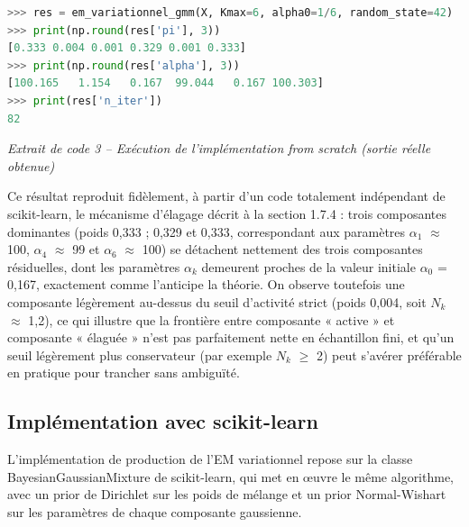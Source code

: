 \begin{lstlisting}[language=Python]
>>> res = em_variationnel_gmm(X, Kmax=6, alpha0=1/6, random_state=42)
>>> print(np.round(res['pi'], 3))
[0.333 0.004 0.001 0.329 0.001 0.333]
>>> print(np.round(res['alpha'], 3))
[100.165   1.154   0.167  99.044   0.167 100.303]
>>> print(res['n_iter'])
82
\end{lstlisting}
\begin{center}\small\emph{Extrait de code 3 -- Exécution de l'implémentation from scratch (sortie réelle obtenue)}\end{center}
Ce résultat reproduit fidèlement, à partir d'un code totalement indépendant de scikit-learn, le mécanisme d'élagage décrit à la section 1.7.4 : trois composantes dominantes (poids 0,333 ; 0,329 et 0,333, correspondant aux paramètres $\alpha _{1}$ $\approx $ 100, $\alpha _{4}$ $\approx $ 99 et $\alpha _{6}$ $\approx $ 100) se détachent nettement des trois composantes résiduelles, dont les paramètres $\alpha _{k}$ demeurent proches de la valeur initiale $\alpha _{0}$ = 0,167, exactement comme l'anticipe la théorie. On observe toutefois une composante légèrement au-dessus du seuil d'activité strict (poids 0,004, soit $N_{k}$ $\approx $ 1,2), ce qui illustre que la frontière entre composante « active » et composante « élaguée » n'est pas parfaitement nette en échantillon fini, et qu'un seuil légèrement plus conservateur (par exemple $N_{k}$ $\geq $ 2) peut s'avérer préférable en pratique pour trancher sans ambiguïté.

\subsection{Implémentation avec scikit-learn}
L'implémentation de production de l'EM variationnel repose sur la classe BayesianGaussianMixture de scikit-learn, qui met en œuvre le même algorithme, avec un prior de Dirichlet sur les poids de mélange et un prior Normal-Wishart sur les paramètres de chaque composante gaussienne.

